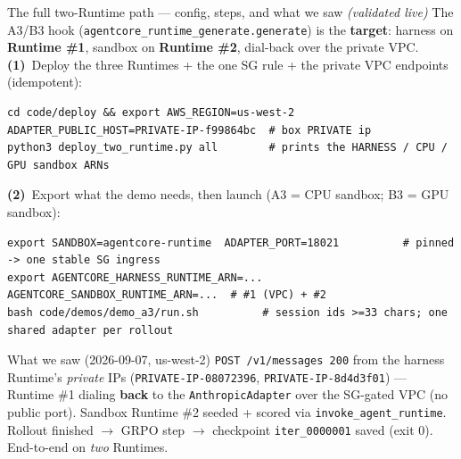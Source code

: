 \documentclass[aspectratio=169]{beamer}
\begin{document}
\begin{frame}[fragile]{The full two-Runtime path --- config, steps, and what we saw \emph{(validated live)}}
  \footnotesize The A3/B3 hook (\texttt{agentcore\_runtime\_generate.generate}) is the \textbf{target}:
  harness on \textbf{Runtime \#1}, sandbox on \textbf{Runtime \#2}, dial-back over the private VPC.
  \vspace{0.2em}\\ \textbf{(1)}~Deploy the three Runtimes + the one SG rule + the private VPC endpoints (idempotent):
\begin{lstlisting}[basicstyle=\ttfamily\scriptsize]
cd code/deploy && export AWS_REGION=us-west-2 ADAPTER_PUBLIC_HOST=PRIVATE-IP-f99864bc  # box PRIVATE ip
python3 deploy_two_runtime.py all        # prints the HARNESS / CPU / GPU sandbox ARNs
\end{lstlisting}
  \vspace{-0.3em}\textbf{(2)}~Export what the demo needs, then launch (A3 = CPU sandbox; B3 = GPU sandbox):
\begin{lstlisting}[basicstyle=\ttfamily\scriptsize]
export SANDBOX=agentcore-runtime  ADAPTER_PORT=18021          # pinned -> one stable SG ingress
export AGENTCORE_HARNESS_RUNTIME_ARN=...  AGENTCORE_SANDBOX_RUNTIME_ARN=...  # #1 (VPC) + #2
bash code/demos/demo_a3/run.sh          # session ids >=33 chars; one shared adapter per rollout
\end{lstlisting}
  \vspace{-0.2em}
  \begin{block}{What we saw (2026-09-07, us-west-2)}
    \scriptsize \texttt{POST /v1/messages 200} from the harness Runtime's \emph{private} IPs
    (\texttt{PRIVATE-IP-08072396}, \texttt{PRIVATE-IP-8d4d3f01}) --- Runtime \#1 dialing \textbf{back} to the
    \texttt{AnthropicAdapter} over the SG-gated VPC (no public port). Sandbox Runtime \#2 seeded +
    scored via \texttt{invoke\_agent\_runtime}. Rollout finished $\to$ GRPO step $\to$ checkpoint
    \texttt{iter\_0000001} saved (exit 0). End-to-end on \emph{two} Runtimes.
  \end{block}
\end{frame}
\end{document}
